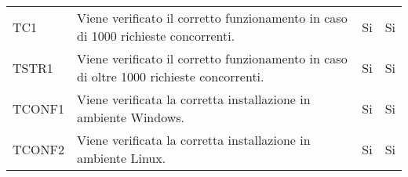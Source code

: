\begin{longtable}{
		>{\centering}p{}
		>{}p{}
		>{\centering}p{}
		>{\centering}p{} }
		TC1 & Viene verificato il corretto funzionamento in caso di 1000 richieste concorrenti. &
		Si &
		Si \tabularnewline
		



		TSTR1 & Viene verificato il corretto funzionamento in caso di oltre 1000 richieste concorrenti. &
		Si &
		Si \tabularnewline
		
		
		
		
		TCONF1 & Viene verificata la corretta installazione in ambiente Windows. &
		Si &
		Si \tabularnewline
		
		TCONF2 & Viene verificata la corretta installazione in ambiente Linux. &
		Si &
		Si \tabularnewline


\end{longtable}
